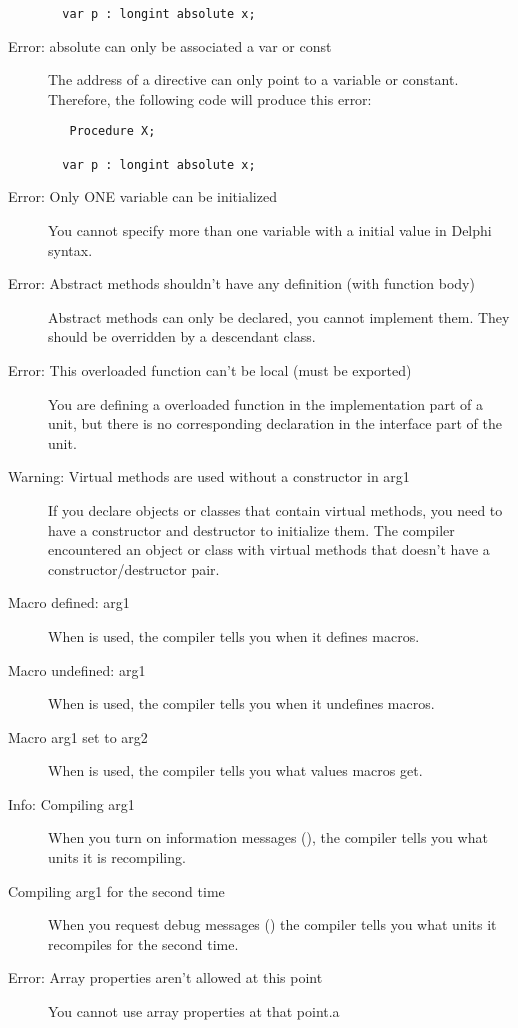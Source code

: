 \begin{description}
\begin{verbatim}
  var p : longint absolute x;
 \end{verbatim}

\item [Error: absolute can only be associated a var or const]
 The address of a  directive can only point to a variable or
 constant. Therefore, the following code will produce this error:
 \begin{verbatim}
   Procedure X;

  var p : longint absolute x;
 \end{verbatim}

\item [Error: Only ONE variable can be initialized]
 You cannot specify more than one variable with a initial value
 in Delphi syntax.
\item [Error: Abstract methods shouldn't have any definition (with function body)]
 Abstract methods can only be declared, you cannot implement them. They
 should be overridden by a descendant class.
\item [Error: This overloaded function can't be local (must be exported)]
 You are defining a overloaded function in the implementation part of a unit,
 but there is no corresponding declaration in the interface part of the unit.
\item [Warning: Virtual methods are used without a constructor in arg1]
 If you declare objects or classes that contain virtual methods, you need
 to have a constructor and destructor to initialize them. The compiler
 encountered an object or class with virtual methods that doesn't have
 a constructor/destructor pair.
\item [Macro defined: arg1]
 When  is used, the compiler tells you when it defines macros.
\item [Macro undefined: arg1]
 When  is used, the compiler tells you when it undefines macros.
\item [Macro arg1 set to arg2]
 When  is used, the compiler tells you what values macros get.
\item [Info: Compiling arg1]
 When you turn on information messages (), the compiler tells you
 what units it is recompiling.
\item [Compiling arg1 for the second time]
 When you request debug messages () the compiler tells you what
 units it recompiles for the second time.
\item [Error: Array properties aren't allowed at this point]
 You cannot use  array properties at that point.a

\end{description}
